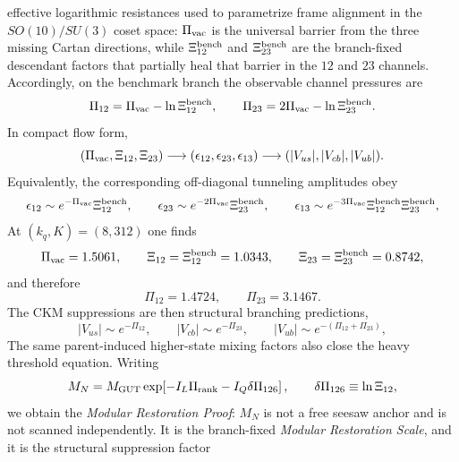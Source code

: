 \documentclass[11pt]{article}
\begin{document}
effective logarithmic resistances used to parametrize frame alignment in the
$SO(10)/SU(3)$ coset space: $\Pi_{\rm vac}$ is the universal barrier from the
three missing Cartan directions, while $\Xi_{12}^{\rm bench}$ and
$\Xi_{23}^{\rm bench}$ are the branch-fixed descendant factors that partially
heal that barrier in the $12$ and $23$ channels. Accordingly, on the
benchmark branch the observable channel pressures are
\begin{equation}
 \Pi_{12}=\Pi_{\rm vac}-\ln\Xi_{12}^{\rm bench},
 \qquad
 \Pi_{23}=2\Pi_{\rm vac}-\ln\Xi_{23}^{\rm bench}.
\end{equation}
In compact flow form,
\begin{equation}
 (\Pi_{\rm vac},\Xi_{12},\Xi_{23})
 \longrightarrow
 (\epsilon_{12},\epsilon_{23},\epsilon_{13})
 \longrightarrow
 (|V_{us}|,|V_{cb}|,|V_{ub}|).
\end{equation}
Equivalently, the corresponding off-diagonal tunneling amplitudes obey
\begin{equation}
 \epsilon_{12}\sim e^{-\Pi_{\rm vac}}\Xi_{12}^{\rm bench},
 \qquad
 \epsilon_{23}\sim e^{-2\Pi_{\rm vac}}\Xi_{23}^{\rm bench},
 \qquad
 \epsilon_{13}\sim e^{-3\Pi_{\rm vac}}\Xi_{12}^{\rm bench}\Xi_{23}^{\rm bench},
\end{equation}
At $(k_q,K)=(8,312)$ one finds
\begin{equation}
 \Pi_{\rm vac}=1.5061,
 \qquad
 \Xi_{12}=\Xi_{12}^{\rm bench}=1.0343,
 \qquad
 \Xi_{23}=\Xi_{23}^{\rm bench}=0.8742,
\end{equation}
and therefore
\begin{equation}
 \Pi_{12}=1.4724,
 \qquad
 \Pi_{23}=3.1467.
\end{equation}
The CKM suppressions are then structural branching predictions,
\begin{equation}
 |V_{us}|\sim e^{-\Pi_{12}},
 \qquad
 |V_{cb}|\sim e^{-\Pi_{23}},
 \qquad
 |V_{ub}|\sim e^{-(\Pi_{12}+\Pi_{23})},
\end{equation}
The same parent-induced higher-state mixing factors also close the heavy
threshold equation. Writing
\begin{equation}
 M_N
 = M_{\rm GUT}\exp\!\left[-I_L\Pi_{\rm rank}-I_Q\delta\Pi_{126}\right],
 \qquad
 \delta\Pi_{126}\equiv\ln\Xi_{12},
 \label{eq:modular-restoration-scale-prediction}
\end{equation}
we obtain the \emph{Modular Restoration Proof}: $M_N$ is not a free seesaw
anchor and is not scanned independently. It is the branch-fixed
\emph{Modular Restoration Scale}, and it is the structural suppression factor
\end{document}
